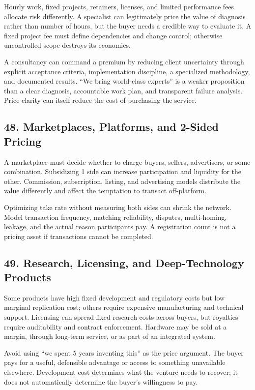Hourly work, fixed projects, retainers, licenses, and limited performance fees allocate risk differently. A specialist can legitimately price the value of diagnosis rather than number of hours, but the buyer needs a credible way to evaluate it. A fixed project fee must define dependencies and change control; otherwise uncontrolled scope destroys its economics.

A consultancy can command a premium by reducing client uncertainty through explicit acceptance criteria, implementation discipline, a specialized methodology, and documented results. ``We bring world-class experts'' is a weaker proposition than a clear diagnosis, accountable work plan, and transparent failure analysis. Price clarity can itself reduce the cost of purchasing the service.

\subsection*{48. Marketplaces, Platforms, and 2-Sided Pricing}

A marketplace must decide whether to charge buyers, sellers, advertisers, or some combination. Subsidizing 1 side can increase participation and liquidity for the other. Commission, subscription, listing, and advertising models distribute the value differently and affect the temptation to transact off-platform.

Optimizing take rate without measuring both sides can shrink the network. Model transaction frequency, matching reliability, disputes, multi-homing, leakage, and the actual reason participants pay. A registration count is not a pricing asset if transactions cannot be completed.

\subsection*{49. Research, Licensing, and Deep-Technology Products}

Some products have high fixed development and regulatory costs but low marginal replication cost; others require expensive manufacturing and technical support. Licensing can spread fixed research costs across buyers, but royalties require auditability and contract enforcement. Hardware may be sold at a margin, through long-term service, or as part of an integrated system.

Avoid using ``we spent 5 years inventing this'' as the price argument. The buyer pays for a useful, defensible advantage or access to something unavailable elsewhere. Development cost determines what the venture needs to recover; it does not automatically determine the buyer's willingness to pay.

